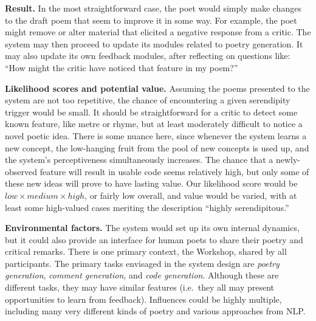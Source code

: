 
\noindent \textbf{Result.}
In the most straightforward case, the poet would simply make changes
to the draft poem that seem to improve it in some way.  For example,
the poet might remove or alter material that elicited a negative
response from a critic.  The system may then proceed to update its modules
related to poetry generation.  It may also update its own
feedback modules, after reflecting on questions like: ``How might the
critic have noticed that feature in my poem?''\par\medskip

\noindent \textbf{Likelihood scores and potential value.}
Assuming the poems presented to the system are not too repetitive, the
chance of encountering a given serendipity trigger would be small.  It
should be straightforward for a critic to detect some known feature,
like metre or rhyme, but at least moderately difficult to notice a
novel poetic idea.  There is some nuance here, since whenever the
system learns a new concept, the low-hanging fruit from the pool of
new concepts is used up, and the system's perceptiveness
simultaneously increases.  The chance that a newly-observed feature
will result in usable code seems relatively high, but only some of
these new ideas will prove to have lasting value.  Our likelihood
score would be $\mathit{low}\times\mathit{medium}\times\mathit{high}$,
or fairly low overall, and value would be varied, with at least some
high-valued cases meriting the description ``highly
serendipitous.''\par\medskip

\noindent \textbf{Environmental factors.}
The system would set up its own internal dynamics, but it could also
provide an interface for human poets to share their poetry and
critical remarks.  There is one primary context, the Workshop, shared
by all participants.  The primary tasks envisaged in the system design
are \emph{poetry generation}, \emph{comment generation},
and \emph{code generation}.  Although these are different tasks, they
may have similar features (i.e.~they all may present opportunities to
learn from feedback).  Influences could be highly multiple, including
many very different kinds of poetry and various approaches from NLP.
